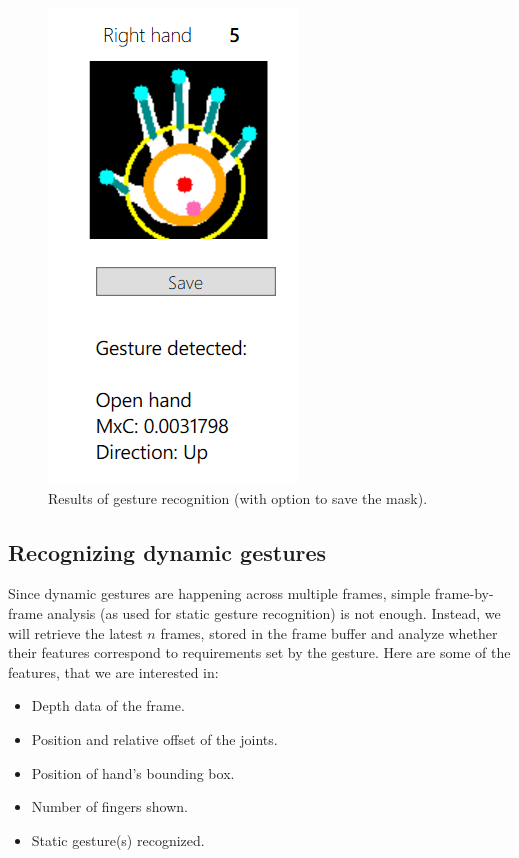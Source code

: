 \documentclass[a4paper,11pt,oneside]{article}
\begin{document}
  \begin{figure}[H]
  \centering
  \includegraphics[scale=1]{hand-control.png}
\caption{Results of gesture recognition (with option to save the mask).}
\end{figure}

\subsection{Recognizing dynamic gestures}
  
Since dynamic gestures are happening across multiple frames, simple frame-by-frame analysis (as used for static gesture recognition) is not enough. Instead, we will retrieve the latest $n$ frames, stored in the frame buffer and analyze whether their features correspond to requirements set by the gesture. Here are some of the features, that we are interested in:

\begin{itemize}
\item Depth data of the frame.
\item Position and relative offset of the joints.
\item Position of hand's bounding box.
\item Number of fingers shown.
\item Static gesture(s) recognized.
\end{itemize}
 
\end{document}
